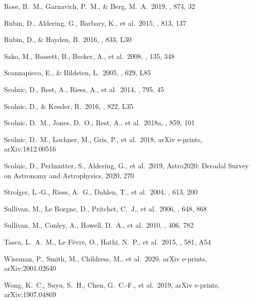 \documentclass[]{aa} %
\begin{document}
\begin{thebibliography}{}
 Rose, B.~M., Garnavich, P.~M., \& Berg, M.~A.\ 2019, \apj, 874, 32


 Rubin, D., Aldering, G., Barbary, K., et al.\ 2015, \apj, 813, 137

 Rubin, D., \& Hayden, B.\ 2016, \apjl, 833, L30


 Sako, M., Bassett, B., Becker, A., et al.\ 2008, \aj, 135, 348

 Scannapieco, E., \& Bildsten, L.\ 2005, \apjl, 629, L85 

 Scolnic, D., Rest, A., Riess, A., et al.\ 2014, \apj, 795, 45

 Scolnic, D., \& Kessler, R.\ 2016, \apjl, 822, L35


 Scolnic, D.~M., Jones, D.~O., Rest, A., et al.\ 2018a, \apj, 859, 101

 Scolnic, D.~M., Lochner, M., Gris, P., et al.\ 2018, arXiv e-prints, arXiv:1812.00516

 Scolnic, D., Perlmutter, S., Aldering, G., et al.\ 2019, Astro2020: Decadal Survey on Astronomy and Astrophysics, 2020, 270

 Strolger, L.-G., Riess, A.~G., Dahlen, T., et al.\ 2004, \apj, 613, 200

 Sullivan, M., Le  Borgne, D., Pritchet, C.~J., et al.\ 2006, \apj, 648, 868 


 Sullivan, M., Conley, A., Howell, D.~A., et al.\ 2010, \mnras, 406, 782

 Tasca, L.~A.~M., Le F{\`e}vre, O., Hathi, N.~P., et al.\ 2015, \aap, 581, A54

 Wiseman, P., Smith, M., Childress, M., et al.\ 2020, arXiv e-prints, arXiv:2001.02640


 Wong, K.~C., Suyu, S.~H., Chen, G.~C.-F., et al.\ 2019, arXiv e-prints, arXiv:1907.04869

\end{thebibliography}
\end{document}
